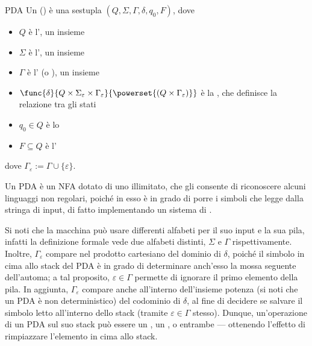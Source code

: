 \documentclass[a4paper, 12pt]{report}
\begin{document}
    \begin{frameddefn}{PDA}
        Un  () è una sestupla $(Q, \Sigma, \Gamma, \delta, q_0, F)$, dove

        \begin{itemize}
            \item $Q$ è l', un insieme 
            \item $\Sigma$ è l', un insieme 
            \item $\Gamma$ è l' (o ), un insieme 
            \item $\func{\delta}{Q \times \Sigma_\varepsilon \times \Gamma_\varepsilon}{\powerset{(Q \times \Gamma_\varepsilon)}}$ è la , che definisce la relazione tra gli stati
            \item $q_0 \in Q$ è lo 
            \item $F \subseteq Q$ è l'
        \end{itemize}

        dove $\Gamma_\varepsilon := \Gamma \cup \{ \varepsilon \}$.

        Un PDA è un NFA dotato di uno  illimitato, che gli consente di riconoscere alcuni linguaggi non regolari, poiché in esso è in grado di porre i simboli che legge dalla stringa di input, di fatto implementando un sistema di .
        
        Si noti che la macchina può usare differenti alfabeti per il suo input e la sua pila, infatti la definizione formale vede due alfabeti distinti, $\Sigma$ e $\Gamma$ rispettivamente. Inoltre, $\Gamma_\varepsilon$ compare nel prodotto cartesiano del dominio di $\delta$, poiché il simbolo in cima allo stack del PDA è in grado di determinare anch'esso la mossa seguente dell'automa; a tal proposito, $\varepsilon \in \Gamma$ permette di ignorare il primo elemento della pila. In aggiunta, $\Gamma_\varepsilon$ compare anche all'interno dell'insieme potenza (si noti che un PDA è non deterministico) del codominio di $\delta$, al fine di decidere se salvare il simbolo letto all'interno dello stack  (tramite $\varepsilon \in \Gamma$ stesso). Dunque, un'operazione di un PDA sul suo stack può essere un , un , o entrambe --- ottenendo l'effetto di rimpiazzare l'elemento in cima allo stack.
    \end{frameddefn}
\end{document}
